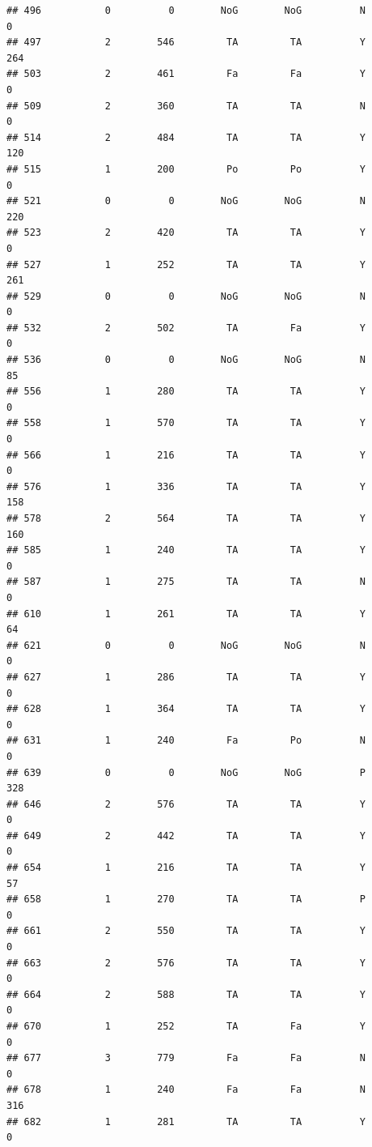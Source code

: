 \documentclass[]{article}
\begin{document}
\begin{verbatim}
## 496           0          0        NoG        NoG          N          0
## 497           2        546         TA         TA          Y        264
## 503           2        461         Fa         Fa          Y          0
## 509           2        360         TA         TA          N          0
## 514           2        484         TA         TA          Y        120
## 515           1        200         Po         Po          Y          0
## 521           0          0        NoG        NoG          N        220
## 523           2        420         TA         TA          Y          0
## 527           1        252         TA         TA          Y        261
## 529           0          0        NoG        NoG          N          0
## 532           2        502         TA         Fa          Y          0
## 536           0          0        NoG        NoG          N         85
## 556           1        280         TA         TA          Y          0
## 558           1        570         TA         TA          Y          0
## 566           1        216         TA         TA          Y          0
## 576           1        336         TA         TA          Y        158
## 578           2        564         TA         TA          Y        160
## 585           1        240         TA         TA          Y          0
## 587           1        275         TA         TA          N          0
## 610           1        261         TA         TA          Y         64
## 621           0          0        NoG        NoG          N          0
## 627           1        286         TA         TA          Y          0
## 628           1        364         TA         TA          Y          0
## 631           1        240         Fa         Po          N          0
## 639           0          0        NoG        NoG          P        328
## 646           2        576         TA         TA          Y          0
## 649           2        442         TA         TA          Y          0
## 654           1        216         TA         TA          Y         57
## 658           1        270         TA         TA          P          0
## 661           2        550         TA         TA          Y          0
## 663           2        576         TA         TA          Y          0
## 664           2        588         TA         TA          Y          0
## 670           1        252         TA         Fa          Y          0
## 677           3        779         Fa         Fa          N          0
## 678           1        240         Fa         Fa          N        316
## 682           1        281         TA         TA          Y          0

\end{verbatim}
\end{document}
